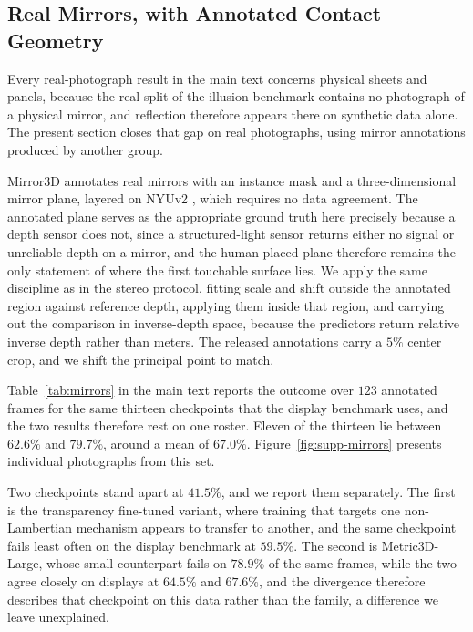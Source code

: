\documentclass{article} %
\theoremstyle{defstyle}
\theoremstyle{plain}
\begin{document}
\subsection{Real Mirrors, with Annotated Contact Geometry}
\label{sec:supp-mirrors}

Every real-photograph result in the main text concerns physical sheets and panels, because
the real split of the illusion benchmark contains no photograph of a physical mirror, and
reflection therefore appears there on synthetic data alone. The present section closes that
gap on real photographs, using mirror annotations produced by another group.

Mirror3D \citep{mirror3d2021} annotates real mirrors with an instance mask and a
three-dimensional mirror plane, layered on NYUv2 \citep{nyuv2_2012}, which requires no data
agreement. The annotated plane serves as the appropriate ground truth here precisely because
a depth sensor does not, since a structured-light sensor returns either no signal or
unreliable depth on a mirror, and the human-placed plane therefore remains the only
statement of where the first touchable surface lies. We apply the same discipline as in the
stereo protocol, fitting scale and shift outside the annotated region against reference
depth, applying them inside that region, and carrying out the comparison in inverse-depth
space, because the predictors return relative inverse depth rather than meters. The released
annotations carry a $5\%$ center crop, and we shift the principal point to match.

Table~\ref{tab:mirrors} in the main text reports the outcome over $123$ annotated frames for
the same thirteen checkpoints that the display benchmark uses, and the two results therefore
rest on one roster. Eleven of the thirteen lie between $62.6\%$ and $79.7\%$, around a mean
of $67.0\%$. Figure~\ref{fig:supp-mirrors} presents individual photographs from this set.

Two checkpoints stand apart at $41.5\%$, and we report them separately. The first is the
transparency fine-tuned variant, where training that targets one non-Lambertian mechanism
appears to transfer to another, and the same checkpoint fails least often on the display
benchmark at $59.5\%$. The second is Metric3D-Large, whose small counterpart fails on
$78.9\%$ of the same frames, while the two agree closely on displays at $64.5\%$ and
$67.6\%$, and the divergence therefore describes that checkpoint on this data rather than
the family, a difference we leave unexplained.
\end{document}
